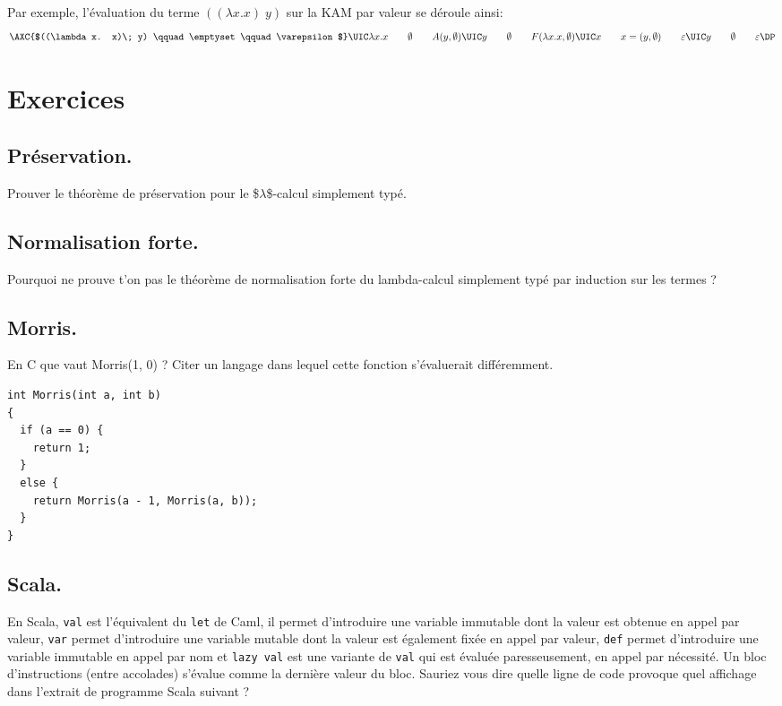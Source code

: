 \documentclass[11pt, a4paper]{article}
\begin{document}
\begin{multicols}{2}
Par exemple, l'évaluation du terme \(((\lambda x. x)\; y)\) sur la KAM par valeur se
déroule ainsi:
$$
\AXC{$((\lambda x. x)\; y) \qquad \emptyset\qquad \varepsilon$}
\kpush{\lambda x. x}{\emptyset}{A(y, \emptyset)}
\kswap{y}{\emptyset}{F(\lambda x. x, \emptyset)}
\kpop{x}{x=(y, \emptyset)}{\varepsilon}
\kderef{y}{\emptyset}{\varepsilon}
\DP
$$



\section{Exercices}
\label{sec:org33e1c23}
\subsection{Préservation.}
\label{sec:org4fdcbe1}
Prouver le théorème de préservation pour le \$\(\lambda\)\$-calcul
simplement typé.

\subsection{Normalisation forte.}
\label{sec:orge0c3444}
Pourquoi ne prouve t'on pas le théorème de normalisation forte du
lambda-calcul simplement typé par induction sur les termes ?


\subsection{Morris.}
\label{sec:orgeaea601}
En C que vaut Morris(1, 0) ? Citer un langage dans lequel cette
fonction s'évaluerait différemment.

\begin{verbatim}
int Morris(int a, int b)
{
  if (a == 0) {
    return 1;
  }
  else {
    return Morris(a - 1, Morris(a, b));
  }
}
\end{verbatim}


\subsection{Scala.}
\label{sec:orgea0f8a3}
En Scala, \texttt{val} est l'équivalent du \texttt{let} de Caml, il
permet d'introduire une variable immutable dont la valeur est obtenue en
appel par valeur, \texttt{var} permet d'introduire une variable
mutable dont la valeur est également fixée en appel par valeur,
\texttt{def} permet d'introduire une variable immutable en appel par
nom et \texttt{lazy val} est une variante de \texttt{val} qui est
évaluée paresseusement, en appel par nécessité. Un bloc d'instructions
(entre accolades) s'évalue comme la dernière valeur du bloc. Sauriez
vous dire quelle ligne de code provoque quel affichage dans l'extrait
de programme Scala suivant ?


\end{multicols}
\end{document}
